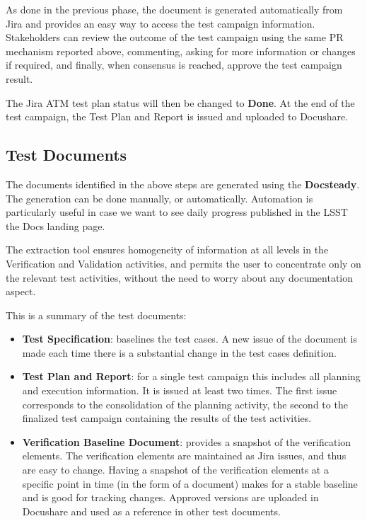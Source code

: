 As done in the previous phase, the document is generated automatically from Jira and provides an easy way to access the test campaign information.
Stakeholders can review the outcome of the test campaign using the same PR mechanism reported above,
commenting, asking for more information or changes if required, and finally, when consensus is reached, approve the test campaign result.

The Jira ATM test plan status will then be changed to \textbf{Done}.
At the end of the test campaign, the Test Plan and Report is issued and uploaded to Docushare.


\subsection{Test Documents}

The documents identified in the above steps are generated using the \textbf{Docsteady}.
The generation can be done manually, or automatically.
Automation is particularly useful in case we want to see daily progress published in the LSST the Docs landing page.

The extraction tool ensures homogeneity of information at all levels in the Verification and Validation activities,
and permits the user to concentrate only on the relevant test activities, without the need to worry about any documentation aspect.

 This is a summary of the test documents:

\begin{itemize}
\item \textbf{Test Specification}:  baselines the test cases.
A new issue of the document is made each time there is a substantial change in the test cases definition.
\item \textbf{Test Plan and Report}:  for a single test campaign this includes all planning and execution information.
It  is issued at least two  times. The first issue corresponds to the consolidation of the planning activity,
the second to the finalized test campaign containing the results of the test activities.
\item \textbf{Verification Baseline Document}: provides a snapshot of the verification elements.
The verification elements are  maintained as Jira issues, and  thus are easy to change.
Having a snapshot of the verification elements at a specific point in time  (in the form of a document) makes
for a stable baseline and is good for tracking changes.
Approved versions are uploaded in Docushare and used as a reference in other test documents.
\end{itemize}

